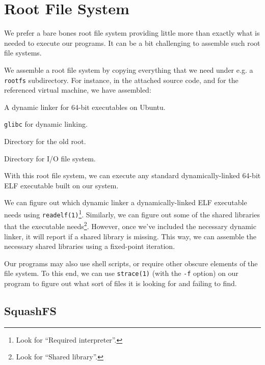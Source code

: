 
\section{Root File System}

We prefer a bare bones root file system providing little more than exactly what
is needed to execute our programs. It can be a bit challenging to assemble such
root file systems.

We assemble a root file system by copying everything that we need under e.g. a
\texttt{rootfs} subdirectory. For instance, in the attached source code, and
for the referenced virtual machine, we have assembled:

\begin{description}[\setleftmargin{0.2in}\breaklabel\setlabelstyle{\tt}]

\item [rootfs/lib64/ld-linux-x86-64.so.2] A dynamic linker for 64-bit executables on Ubuntu.

\item [rootfs/lib/x86\_64-linux-gnu/libc.so.6] \texttt{glibc} for dynamic linking.

\item [rootfs/.oldroot] Directory for the old root.

\item [rootfs/home/student] Directory for I/O file system.

\end{description}

With this root file system, we can execute any standard dynamically-linked
64-bit ELF executable built on our system.

We can figure out which dynamic linker a dynamically-linked ELF executable
needs using \texttt{readelf(1)}\footnote{Look for ``Required interpreter''.}.
Similarly, we can figure out some of the shared libraries that the executable
needs\footnote{Look for ``Shared library''.}. However, once we've included the
necessary dynamic linker, it will report if a shared library is missing. This
way, we can assemble the necessary shared libraries using a fixed-point
iteration.

Our programs may also use shell scripts, or require other obscure elements of
the file system. To this end, we can use \texttt{strace(1)} (with the
\texttt{-f} option) on our program to figure out what sort of files it is
looking for and failing to find.

\subsection{SquashFS}

